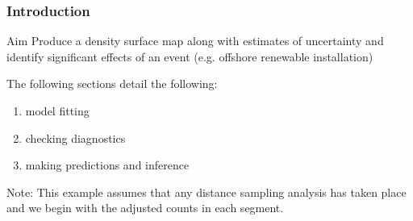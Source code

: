\begin{frame}
\frametitle{Introduction} 

\begin{block}{Aim}
Produce a density surface map along with estimates of uncertainty and identify significant effects of an event (e.g. offshore renewable installation)
\end{block}

The following sections detail the following:

\begin{enumerate}
  \item model fitting 
  \item checking diagnostics
  \item making predictions and inference
\end{enumerate}

\bigskip

\noindent Note: This example assumes that any distance sampling analysis has taken place and we begin with the adjusted counts in each segment.  
\end{frame}



